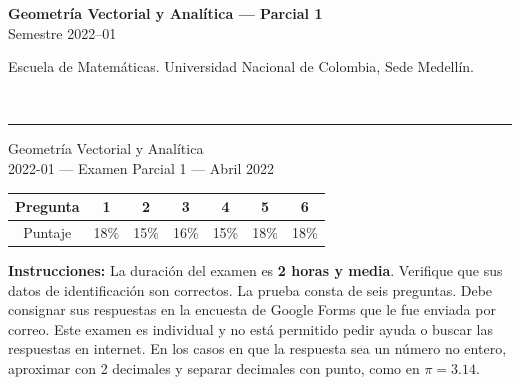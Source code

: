 \documentclass[11pt]{article}
\begin{document}
\noindent
\begin{minipage}[t]{0.6\linewidth}
{\small\bfseries Geometría Vectorial y Analítica --- Parcial 1}\\
{\small Semestre 2022--01}
\end{minipage}%
\hfill
\begin{minipage}[t]{0.35\linewidth}
\raggedleft\small Escuela de Matemáticas. Universidad Nacional de Colombia, Sede Medellín.
\end{minipage}\\[2pt]
\rule{\linewidth}{0.6pt}

\vspace{6pt}
\noindent Geometría Vectorial y Analítica\\
2022-01 --- Examen Parcial 1 --- Abril 2022

\vspace{6pt}
\begin{center}
\begin{tabular}{|c|c|c|c|c|c|c|}
\hline
Pregunta & 1 & 2 & 3 & 4 & 5 & 6 \\
\hline
Puntaje & 18\% & 15\% & 16\% & 15\% & 18\% & 18\% \\
\hline
\end{tabular}
\end{center}

\vspace{10pt}
\textbf{Instrucciones:} La duración del examen es \textbf{2 horas y media}. Verifique que sus datos de identificación son correctos. La prueba consta de seis preguntas. Debe consignar sus respuestas en la encuesta de Google Forms que le fue enviada por correo. Este examen es individual y no está permitido pedir ayuda o buscar las respuestas en internet. En los casos en que la respuesta sea un número no entero, aproximar con 2 decimales y separar decimales con punto, como en $\pi=3.14$.
\end{document}
